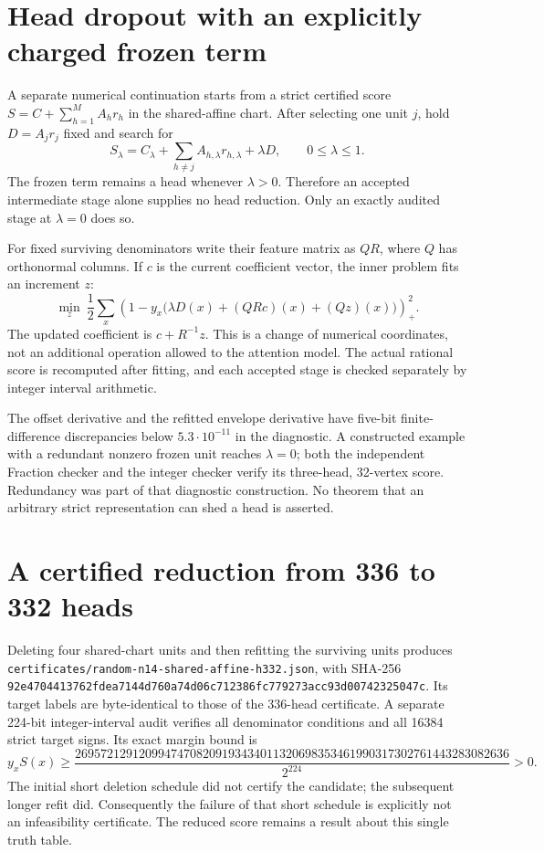 \documentclass[11pt]{article}
\begin{document}
\section{Head dropout with an explicitly charged frozen term}

A separate numerical continuation starts from a strict certified score
$S=C+\sum_{h=1}^M A_hr_h$ in the shared-affine chart. After selecting
one unit $j$, hold $D=A_jr_j$ fixed and search for
\[
 S_\lambda=C_\lambda+\sum_{h\ne j}A_{h,\lambda}r_{h,\lambda}
                  +\lambda D,\qquad 0\le\lambda\le1.
\]
The frozen term remains a head whenever $\lambda>0$. Therefore an
accepted intermediate stage alone supplies no head reduction.
Only an exactly audited stage at $\lambda=0$ does so.

For fixed surviving denominators write their feature matrix as $QR$,
where $Q$ has orthonormal columns. If $c$ is the current coefficient
vector, the inner problem fits an increment $z$:
\[
 \min_z\ \frac12\sum_x
 \left(1-y_x\bigl(\lambda D(x)+(QRc)(x)+(Qz)(x)\bigr)\right)_+^2.
\]
The updated coefficient is $c+R^{-1}z$. This is a change of numerical
coordinates, not an additional operation allowed to the attention model.
The actual rational score is recomputed after fitting, and each accepted
stage is checked separately by integer interval arithmetic.

The offset derivative and the refitted envelope derivative have
five-bit finite-difference discrepancies below $5.3\cdot10^{-11}$ in
the diagnostic. A constructed example with a redundant nonzero frozen
unit reaches $\lambda=0$; both the independent Fraction checker and the
integer checker verify its three-head, 32-vertex score. Redundancy was
part of that diagnostic construction. No theorem that an arbitrary
strict representation can shed a head is asserted.


\section{A certified reduction from 336 to 332 heads}

Deleting four shared-chart units and then refitting the surviving units
produces \texttt{certificates/random-n14-shared-affine-h332.json}, with
SHA-256
\texttt{92e4704413762fdea7144d760a74d06c712386fc779273acc93d00742325047c}.
Its target labels are byte-identical to those of the 336-head certificate.
A separate 224-bit integer-interval audit verifies all denominator
conditions and all 16384 strict target signs. Its exact margin bound is
\[
 y_xS(x)\ge
 \frac{26957212912099474708209193434011320698353461990317302761443283082636}
 {2^{224}}>0.
\]
The initial short deletion schedule did not certify the candidate;
the subsequent longer refit did. Consequently the failure of that
short schedule is explicitly not an infeasibility certificate.
The reduced score remains a result about this single truth table.
\end{document}
